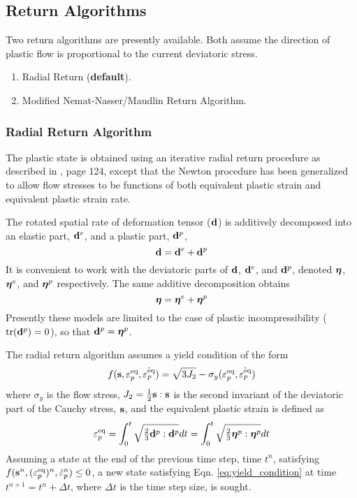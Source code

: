 \subsection{Return Algorithms}

Two return algorithms are presently available.  Both assume the direction
of plastic flow is proportional to the current deviatoric stress.
  \begin{enumerate}
    \item Radial Return ({\bf default}).
    \item Modified Nemat-Nasser/Maudlin Return Algorithm.
  \end{enumerate}

\subsubsection{Radial Return Algorithm}
The plastic state is obtained using an iterative radial return
procedure as described in \cite{Simo1998}, page 124, except that the
Newton procedure has been generalized to allow flow stresses to be
functions of both equivalent plastic strain and equivalent plastic
strain rate.

The rotated spatial rate of deformation tensor ($\mathbf{d}$) is additively
decomposed into an elastic part, $\mathbf{d}^e$, and a plastic part, $\mathbf{d}^p$,
  \begin{equation}
     \mathbf{d} = \mathbf{d}^e + \mathbf{d}^p
  \end{equation}
  It is convenient to work with the deviatoric parts of $\mathbf{d}$,
  $\mathbf{d}^e$, and $\mathbf{d}^p$, denoted $\boldsymbol{\eta}$, $\boldsymbol{\eta}^e$, and
  $\boldsymbol{\eta}^p$ respectively. The same additive decomposition obtains
  \begin{equation}
     \boldsymbol{\eta} = \boldsymbol{\eta}^e + \boldsymbol{\eta}^p
  \end{equation}
  Presently these models are limited to the case of plastic
  incompressibility ($\text{tr}{(\ensuremath{\mathbf{d}}^p)} = 0$), so that $\mathbf{d}^p=\boldsymbol{\eta}^p$.

The radial return algorithm assumes a yield condition of the form 
  \begin{equation}\label{eq:yield_condition}
    f(\mathbf{s},\varepsilon_p^\text{eq},\dot{\varepsilon_p^\text{eq}}) = \sqrt{3J_2} - \sigma_y(\varepsilon_p^\text{eq},\dot{\varepsilon_p^\text{eq}})
  \end{equation}
where $\sigma_y$ is the flow stress, $J_2 = \tfrac{1}{2}\mathbf{s}:\mathbf{s}$ is the
second invariant of the deviatoric part of the Cauchy stress, $\mathbf{s}$,
and the equivalent plastic strain is defined as
  \begin{equation}\label{eq:ep}
    \varepsilon_p^\text{eq} = \int_0^t\sqrt{\tfrac{2}{3}\mathbf{d}^p:\mathbf{d}^p}dt = \int_0^t\sqrt{\tfrac{2}{3}\boldsymbol{\eta}^p:\boldsymbol{\eta}^p}dt
  \end{equation}
Assuming a state at the end of the previous time step, time $t^n$,
satisfying $f(\mathbf{s}^n,(\varepsilon_p^\text{eq})^n,\dot{\varepsilon}_{p}^n)\le0$, a new state satisfying
Eqn. \ref{eq:yield_condition} at time $t^{n+1}=t^n+\Delta t$, where
$\Delta t$ is the time step size, is sought.

